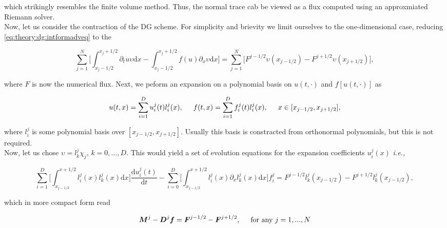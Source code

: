 which strikingly resembles the finite volume method. Thus, the normal trace cab be viewed as a flux computed using an approxmiated Riemann solver. \\

Now, let us consider the contraction of the DG scheme. For simplicity and brievity we limit ourselves to the one-dimensional case, reducing \ref{eq:theory:dg:intformadveq} to the 

\begin{equation}
\sum_{j=1}^{N}\Bigg[\int_{x_j - 1/2}^{x_j +1/2}\partial_t u \upsilon \text{d}x - \int_{x_j - 1/2}^{x_j +1/2}f(u)\partial_x\upsilon\text{d}x\Bigg] = \sum_{j=1}^{N}\big[F^{j-1/2}\upsilon(x_{j-1/2}) - F^{j+1/2}\upsilon(x_{j+1/2})\big],
\end{equation}

where $F$ is now the numerical flux. Next, we peform an expansion on a polynomial basis on $u(t,\cdot)$ and $f[u(t,\cdot)]$ as

\begin{equation}
u(t,x) = \sum_{i=1}^{D}u_{i}^{j}(t)l_{i}^{j}(x), \hspace{5mm} f(t,x) = \sum_{i=1}^{D}f_{i}^{j}(t)l_{i}^{j}(x), \hspace{5mm} x\in[x_{j-1/2}, x_{j+1/2}],
\end{equation}

where $l_{i}^{j}$ is some polynomial basis over $[x_{j-1/2}, x_{j+1/2}]$. Usually this basis is constracted from orthonormal polynomials, but this is not required. \\
Now, let us chose $\upsilon = l_{k}^{j}\chi_j$, $k=0,...,D$. This would yield a set of evolution equations for the expansion coefficients $u_{i}^{j}(x)$ \textit{i.e.,}

\begin{equation}
\sum_{i=1}^{D}\Bigg[\int_{x_{j-1/2}}^{x+1/2}l_{i}^{j}(x)l_{k}^{j}(x)\text{d}x\Bigg]\frac{\text{d}u_{i}^{j}(t)}{\text{d}t} - \sum_{i=0}^{D}\Bigg[ \int_{x_{j-1/2}}^{x+1/2}l_{i}^{j}(x)\partial_{x}l_{k}^{j}(x)\text{d}x \Bigg]f_{i}^{j} = F^{j-1/2}l_{k}^{j}(x_{j-1/2}) - F^{j+1/2}l_{k}^{j}(x_{j-1/2}),
\end{equation}

which in more compact form read

\begin{equation}
\boldsymbol{M}^{j} - \boldsymbol{D}^{j}\boldsymbol{f} = \boldsymbol{F}^{j-1/2} - \boldsymbol{F}^{j+1/2}, \hspace{5mm} \text{for any } j=1,...,N
\end{equation}

